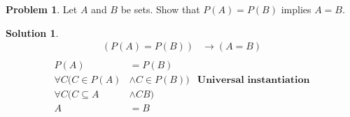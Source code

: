 \documentclass{article}
\theoremstyle{definition}
\newtheorem{problem}{Problem}
\newtheorem*{solution}{Solution}
\begin{document}
\begin{problem} Let $A$ and $B$ be sets. Show that $P(A)=P(B)$ implies $A=B$.
\end{problem}
\begin{solution}
\begin{align*}
  (P(A)=P(B))&\rightarrow(A=B) \\
\end{align*}
\begin{align*}
  P(A) &= P(B) \\
  \forall C(C \in P(A) &\land C \in P(B)) &\textbf{Universal instantiation} \\
  \forall C(C \subseteq A &\land C  B) \\
  A &= B
\end{align*}
\end{solution}
\end{document}
